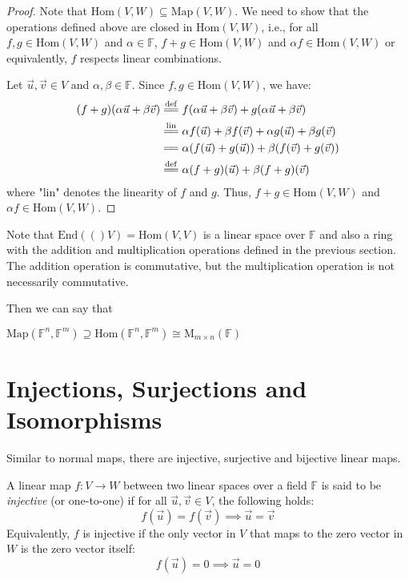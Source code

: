 \documentclass[
	11pt, %
	fleqn, %
	a4paper, %
]{LegrandOrangeBook}
\newcommand{\End}[1]{\text{End}(#1)} %
\newcommand{\Hom}{\text{Hom}} %
\newcommand{\F}{\mathbb{F}} %
\newcommand{\M}[2]{\text{M}_{#1}(#2)} %
\newcommand{\Map}{\text{Map}} %
\begin{document}
\begin{proof}
    Note that $\Hom(V, W) \subseteq \Map(V, W)$. We need to show that the operations defined above are closed in $\Hom(V, W)$, i.e., for all $f, g \in \Hom(V, W)$ and $\alpha \in \F$, $f + g \in \Hom(V, W)$ and $\alpha f \in \Hom(V, W)$ or equivalently, $f$ respects linear combinations.

    Let $\vec{u}, \vec{v} \in V$ and $\alpha, \beta \in \F$. Since $f, g \in \Hom(V, W)$, we have:
    \[
        \begin{split}
            (f + g)(\alpha\vec{u} + \beta\vec{v}) &\overset{\mathrm{def}}{=\joinrel=} f(\alpha\vec{u} + \beta\vec{v}) + g(\alpha\vec{u} + \beta\vec{v}) \\
            &\overset{\mathrm{lin}}{=\joinrel=} \alpha f(\vec{u}) + \beta f(\vec{v}) + \alpha g(\vec{u}) + \beta g(\vec{v}) \\
            &=\joinrel= \alpha (f(\vec{u}) + g(\vec{u})) + \beta (f(\vec{v}) + g(\vec{v})) \\
            &\overset{\mathrm{def}}{=\joinrel=} \alpha (f + g)(\vec{u}) + \beta (f + g)(\vec{v})
        \end{split}
    \]
    where "lin" denotes the linearity of $f$ and $g$. Thus, $f + g \in \Hom(V, W)$ and $\alpha f \in \Hom(V, W)$.
\end{proof}

\begin{remark}
    Note that $\End(V) = \Hom(V, V)$ is a linear space over $\F$ and also a ring with the addition and multiplication operations defined in the previous section. The addition operation is commutative, but the multiplication operation is not necessarily commutative.
\end{remark}

Then we can say that 
\begin{center}
    $\Map(\F^n, \F^m) \supseteq \Hom(\F^n, \F^m) \cong \M{m \times n}{\F}$
\end{center}


\newpage

\section{Injections, Surjections and Isomorphisms}

Similar to normal maps, there are injective, surjective and bijective linear maps.

\begin{definition}
    A linear map $f: V \to W$ between two linear spaces over a field $\F$ is said to be \emph{injective} (or one-to-one) if for all $\vec{u}, \vec{v} \in V$, the following holds:
    \[
        f(\vec{u}) = f(\vec{v}) \implies \vec{u} = \vec{v}
    \]
    Equivalently, $f$ is injective if the only vector in $V$ that maps to the zero vector in $W$ is the zero vector itself:
    \[
        f(\vec{u}) = 0 \implies \vec{u} = 0
    \]
\end{definition}
\end{document}
